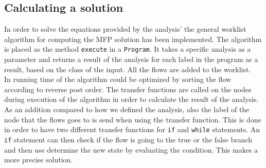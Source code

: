 \subsection{Calculating a solution}
In order to solve the equations provided by the analysis' the general worklist algorithm for computing the MFP solution has been implemented. The algorithm is placed as the method \texttt{execute} in a \texttt{Program}. It takes a specific analysis as a parameter and returns a result of the analysis for each label in the program as a result, based on the class of the input. All the flows are added to the worklist.\\
In running time of the algorithm could be optimized by sorting the flow according to reverse post order. The transfer functions are called on the nodes during execution of the algorithm in order to calculate the result of the analysis. As an addition compared to how we defined the analysis, also the label of the node that the flows goes to is send when using the transfer function. This is done in order to have two different transfer functions for \texttt{if} and \texttt{while} statements. An \texttt{if} statement can then check if the flow is going to the true or the false branch and then use determine the new state by evaluating the condition. This makes a more precise solution.